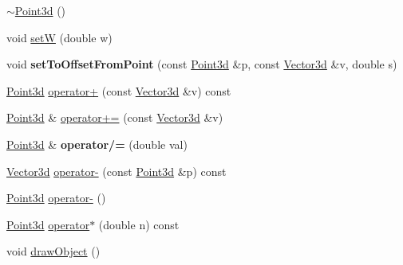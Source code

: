 \begin{DoxyCompactItemize}
\item 
\hyperlink{classCartWheel_1_1Math_1_1Point3d_a95a6847d70d5e7f1e89977f34b9d561c}{$\sim$Point3d} ()
\item 
void \hyperlink{classCartWheel_1_1Math_1_1Point3d_ae5925e6a4a4b3b90f30610191e89c863}{setW} (double w)
\item 
\hypertarget{classCartWheel_1_1Math_1_1Point3d_a8feb34c9469d7369f7d339a9f67debe2}{
void {\bfseries setToOffsetFromPoint} (const \hyperlink{classCartWheel_1_1Math_1_1Point3d}{Point3d} \&p, const \hyperlink{classCartWheel_1_1Math_1_1Vector3d}{Vector3d} \&v, double s)}
\label{classCartWheel_1_1Math_1_1Point3d_a8feb34c9469d7369f7d339a9f67debe2}

\item 
\hyperlink{classCartWheel_1_1Math_1_1Point3d}{Point3d} \hyperlink{classCartWheel_1_1Math_1_1Point3d_aa72d158cf8d6f11c5646d6c79f8256b9}{operator+} (const \hyperlink{classCartWheel_1_1Math_1_1Vector3d}{Vector3d} \&v) const 
\item 
\hyperlink{classCartWheel_1_1Math_1_1Point3d}{Point3d} \& \hyperlink{classCartWheel_1_1Math_1_1Point3d_a83f481c82ffbed5b3c4f9842ca9ea543}{operator+=} (const \hyperlink{classCartWheel_1_1Math_1_1Vector3d}{Vector3d} \&v)
\item 
\hypertarget{classCartWheel_1_1Math_1_1Point3d_a4745837ae17db3a494609a008d8bbcb3}{
\hyperlink{classCartWheel_1_1Math_1_1Point3d}{Point3d} \& {\bfseries operator/=} (double val)}
\label{classCartWheel_1_1Math_1_1Point3d_a4745837ae17db3a494609a008d8bbcb3}

\item 
\hyperlink{classCartWheel_1_1Math_1_1Vector3d}{Vector3d} \hyperlink{classCartWheel_1_1Math_1_1Point3d_a6a8d74986ba3e2e1a30632d0d8e981fb}{operator-\/} (const \hyperlink{classCartWheel_1_1Math_1_1Point3d}{Point3d} \&p) const 
\item 
\hyperlink{classCartWheel_1_1Math_1_1Point3d}{Point3d} \hyperlink{classCartWheel_1_1Math_1_1Point3d_a4e4c20ab010c596512991eedd7b52833}{operator-\/} ()
\item 
\hyperlink{classCartWheel_1_1Math_1_1Point3d}{Point3d} \hyperlink{classCartWheel_1_1Math_1_1Point3d_a4c46bd5ab3db7e6566abb5b9495d40d5}{operator$\ast$} (double n) const 
\item 
void \hyperlink{classCartWheel_1_1Math_1_1Point3d_ad4784634835bd008130e762549635a6e}{drawObject} ()
\end{DoxyCompactItemize}


